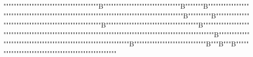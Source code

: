   """""""""""""""""""""""""""""""""""""B""""""""""""""""""""""""""""""B"""""""B""""""""""""""""""""""""""""""""""""""""""""""""""""""""""""""""""""""""""""""""""""""B"""""""""B"""""""""""""""""""""""""""""""""""""""""""""""""""B""""""""""""""""""""""""""""""""""""B""""""""""""""""""""""""""""""""""""""""""""""""""""""""""""""""""""""""""""""""""""""""""""""""""""B"""""""""""""""""""""""""""""""""""""""""""""""""""""""""""""B""""""""""""""""""""""""""""B"""B"""B"""""""""""""""""""""""""""""""""""""""""""""""""